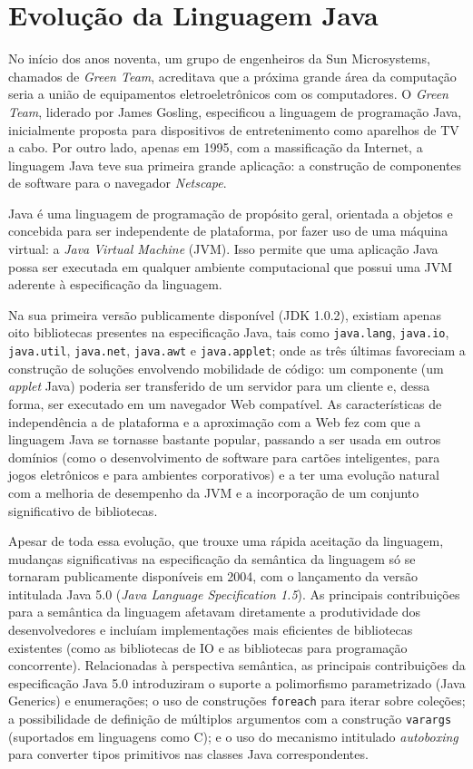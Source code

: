 \section{Evolução da Linguagem Java}\label{sec:evolucaoJava}
No início dos anos noventa, um grupo de engenheiros da Sun Microsystems, chamados de \textit{Green Team}, acreditava que a próxima grande área da computação seria a união de equipamentos eletroeletrônicos com os 
computadores. O \textit{Green Team}, liderado por James Gosling, especificou a linguagem de programação Java, 
inicialmente proposta para dispositivos de entretenimento como aparelhos de TV a cabo. Por outro lado, apenas em \num{1995}, com a massificação da Internet, a linguagem Java teve sua primeira grande aplicação: a construção de componentes de software para o navegador \textit{Netscape}.

Java é uma linguagem de programação de propósito geral, orientada a objetos e concebida para ser independente de plataforma, por fazer uso de uma máquina virtual: a \emph{Java Virtual Machine} (JVM). Isso permite que uma aplicação Java possa ser executada em qualquer ambiente computacional que possui uma JVM aderente à especificação da linguagem.

Na sua primeira versão publicamente disponível (\acs{JDK} 1.0.2), existiam apenas oito bibliotecas 
presentes na especificação Java, tais como \texttt{java.lang}, \texttt{java.io}, \texttt{java.util},  
\texttt{java.net}, \texttt{java.awt} e \texttt{java.applet}; onde as três últimas favoreciam a construção de soluções envolvendo mobilidade de código: um componente (um \textit{applet} Java) poderia ser transferido de um servidor para um cliente e, dessa forma, ser executado em um navegador Web compatível. As características de independência a de plataforma e a aproximação com a Web fez com que a linguagem Java se tornasse bastante popular, passando a ser usada em outros domínios  (como o desenvolvimento de software 
para cartões inteligentes, para jogos eletrônicos e para ambientes corporativos) e a ter uma evolução natural com a melhoria de desempenho da JVM e a incorporação de um conjunto significativo de  bibliotecas. 

Apesar de toda essa evolução, que trouxe uma rápida aceitação da linguagem, mudanças significativas na especificação da semântica da linguagem só se tornaram publicamente disponíveis em 2004, com o lançamento da versão intitulada Java 5.0 (\emph{Java Language Specification 1.5}). As principais contribuições para a semântica da linguagem afetavam diretamente a produtividade dos desenvolvedores e incluíam implementações mais eficientes de bibliotecas existentes (como as bibliotecas de IO e as bibliotecas para programação concorrente). Relacionadas à perspectiva semântica, as principais contribuições da especificação Java 5.0 introduziram o suporte a polimorfismo parametrizado (Java Generics) e enumerações; o uso de construções \texttt{foreach} para iterar sobre coleções; a possibilidade de definição de múltiplos argumentos com a construção \texttt{varargs} (suportados em linguagens como C); e o uso do mecanismo intitulado \emph{autoboxing} para converter tipos primitivos nas classes Java correspondentes. 

